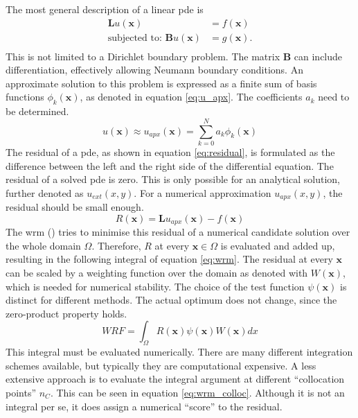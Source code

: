 \documentclass[./\jobname.tex]{subfiles}
\begin{document}
The most general description of a linear \gls{pde} is 
\begin{equation}
\label{eq:general_pde}
\begin{split}
\mathbf{L}u(\mathbf{x}) & = f(\mathbf{x}) \\
\text{subjected to: }\mathbf{B}u(\mathbf{x}) & = g(\mathbf{x}). \\
\end{split}
\end{equation}
This is not limited to a Dirichlet boundary problem. The matrix $\mathbf{B}$ can include differentiation, effectively allowing Neumann boundary conditions. An approximate solution to this problem is expressed as a finite sum of basis functions $\phi_k(\mathbf{x})$, as denoted in equation \eqref{eq:u_apx}. The coefficients $a_k$ need to be determined. 
\begin{equation}
\label{eq:u_apx}
u(\mathbf{x}) \approx u_{apx}(\mathbf{x}) = \sum_{k=0}^{N} a_k \phi_k (\mathbf{x})
\end{equation}
The residual of a \gls{pde}, as shown in equation \eqref{eq:residual}, is formulated as the difference between the left and the right side of the differential equation. The residual of a solved \gls{pde} is zero. This is only possible for an analytical solution, further denoted as $u_{ext}(x,y)$. For a numerical approximation $u_{apx}(x,y)$, the residual should be small enough.
\begin{equation}
\label{eq:residual}
R(\mathbf{x}) = \mathbf{L}u_{apx}(\mathbf{x}) - f(\mathbf{x})
\end{equation}
The \gls{wrm} (\cite{shen_spectral_2011}) tries to minimise this residual of a numerical candidate solution over the whole domain $\Omega$. Therefore, $R$ at every $\mathbf{x} \in \Omega$ is evaluated and added up, resulting in the following integral of equation \eqref{eq:wrm}. The residual at every $\mathbf{x}$ can be scaled by a weighting function over the domain as denoted with $W(\mathbf{x})$, which is needed for numerical stability. The choice of the test function $\psi(\mathbf{x})$ is distinct for different methods. The actual optimum does not change, since the zero-product property holds. 
\begin{equation}
\label{eq:wrm}
WRF = \int_{\Omega} R(\mathbf{x}) \psi(\mathbf{x}) W(\mathbf{x}) dx
\end{equation}
This integral must be evaluated numerically. There are many different integration schemes available, but typically they are computational expensive. A less extensive approach is to evaluate the integral argument at different ``collocation points'' $n_C$. This can be seen in equation \eqref{eq:wrm_colloc}. Although it is not an integral per se, it does assign a numerical ``score'' to the residual. 
\end{document}
